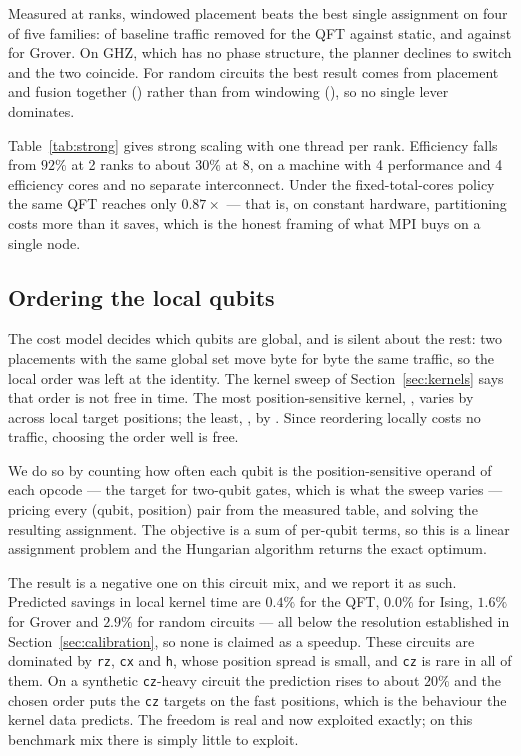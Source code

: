 \documentclass[11pt]{article}
\begin{document}
Measured at \aegisqRanks{} ranks, windowed placement beats the best single
assignment on four of five families: \aegisqQftWindowed{} of baseline traffic
removed for the QFT against \aegisqQftPlacement{} static, and
\aegisqGroverWindowed{} against \aegisqGroverPlacement{} for Grover. On GHZ,
which has no phase structure, the planner declines to switch and the two
coincide. For random circuits the best result comes from placement and fusion
together (\aegisqRandomBoth) rather than from windowing
(\aegisqRandomWindowed), so no single lever dominates.



Table~\ref{tab:strong} gives strong scaling with one thread per rank. Efficiency
falls from $92\%$ at 2 ranks to about $30\%$ at 8, on a machine with 4
performance and 4 efficiency cores and no separate interconnect. Under the
fixed-total-cores policy the same QFT reaches only $0.87\times$ --- that is, on
constant hardware, partitioning costs more than it saves, which is the honest
framing of what MPI buys on a single node.

\subsection{Ordering the local qubits}
\label{sec:localorder}

The cost model decides which qubits are global, and is silent about the rest:
two placements with the same global set move byte for byte the same traffic,
so the local order was left at the identity. The kernel sweep of
Section~\ref{sec:kernels} says that order is not free in time. The most
position-sensitive kernel, \aegisqWorstPositionKernel, varies by
\aegisqWorstPositionSpread{} across local target positions; the least,
\aegisqBestPositionKernel, by \aegisqBestPositionSpread. Since reordering
locally costs no traffic, choosing the order well is free.

We do so by counting how often each qubit is the position-sensitive operand of
each opcode --- the target for two-qubit gates, which is what the sweep varies
--- pricing every (qubit, position) pair from the measured table, and solving
the resulting assignment. The objective is a sum of per-qubit terms, so this
is a linear assignment problem and the Hungarian algorithm returns the exact
optimum.

The result is a negative one on this circuit mix, and we report it as such.
Predicted savings in local kernel time are $0.4\%$ for the QFT, $0.0\%$ for
Ising, $1.6\%$ for Grover and $2.9\%$ for random circuits --- all below the
resolution established in Section~\ref{sec:calibration}, so none is claimed
as a speedup. These circuits are dominated by \texttt{rz}, \texttt{cx} and
\texttt{h}, whose position spread is small, and \texttt{cz} is rare in all of
them. On a synthetic \texttt{cz}-heavy circuit the prediction rises to about
$20\%$ and the chosen order puts the \texttt{cz} targets on the fast
positions, which is the behaviour the kernel data predicts. The freedom is
real and now exploited exactly; on this benchmark mix there is simply little
to exploit.
\end{document}
